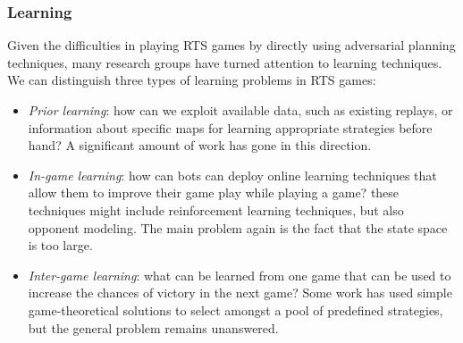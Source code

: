 \documentclass[journal]{IEEEtran}
\begin{document}
\subsubsection{Learning}
Given the difficulties in playing RTS games by directly using adversarial planning techniques, many research groups have turned attention to learning techniques. We can distinguish three types of learning problems in RTS games:
\begin{itemize}
\item {\em Prior learning}: how can we exploit available data, such as existing replays, or information about specific maps for learning appropriate strategies before hand? A significant amount of work has gone in this direction.%
\item {\em In-game learning}: how can bots can deploy online learning techniques that allow them to improve their game play while playing a game? these techniques might include reinforcement learning techniques, but also opponent modeling. The main problem again is the fact that the state space is too large.
\item {\em Inter-game learning}: what can be learned from one game that can be used to increase the chances of victory in the next game? Some work has used simple game-theoretical solutions to select amongst a pool of predefined strategies, but the general problem remains unanswered.
\end{itemize}

\end{document}
